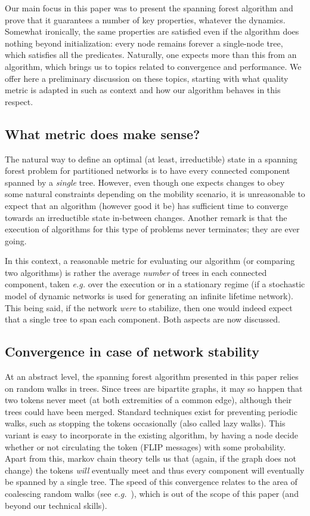 \documentclass[twocolumn]{article}
\begin{document}
Our main focus in this paper was to present the spanning forest algorithm and prove that it guarantees a number of key properties, whatever the dynamics. Somewhat ironically, the same properties are satisfied even if the algorithm does nothing beyond initialization: every node remains forever a single-node tree, which satisfies all the predicates. Naturally, one expects more than this from an algorithm, which brings us to topics related to convergence and performance. We offer here a preliminary discussion on these topics, starting with what quality metric is adapted in such as context and how our algorithm behaves in this respect.


\subsection{What metric does make sense?}
\label{sec:metric}

The natural way to define an optimal (at least, irreductible) state in a spanning forest problem for partitioned networks is to have every connected component spanned by a {\em single} tree. However, even though 
one expects changes to obey some natural constraints depending on the mobility scenario, it is unreasonable to expect that an algorithm (however good it be) has sufficient time to converge towards an irreductible state in-between changes. Another remark is that the execution of algorithms for this type of problems never terminates; they are ever going.

In this context, a reasonable metric for evaluating our algorithm (or comparing two algorithms) is rather the average {\em number} of trees in each connected component, taken {\it e.g.} over the execution or in a stationary regime (if a stochastic model of dynamic networks is used for generating an infinite lifetime network). This being said, if the network {\em were} to stabilize, then one would indeed expect that a single tree to span each component. Both aspects are now discussed.


\subsection{Convergence in case of network stability} At an abstract level, the spanning forest algorithm presented in this paper relies on random walks in trees. Since trees are bipartite graphs, it may so happen that two tokens never meet (at both extremities of a common edge), although their trees could have been merged. 
Standard techniques exist for preventing periodic walks, such as stopping the tokens occasionally (also called lazy walks). This variant is easy to incorporate in the existing algorithm, by having a node decide whether or not circulating the token (FLIP messages) with some probability. Apart from this, markov chain theory tells us that (again, if the graph does not change) the tokens {\em will} eventually meet and thus every component will eventually be spanned by a single tree. The speed of this convergence relates to the area of coalescing random walks (see {\it e.g.}~\cite{Cooper13}), which is out of the scope of this paper (and beyond our technical skills).
\end{document}
